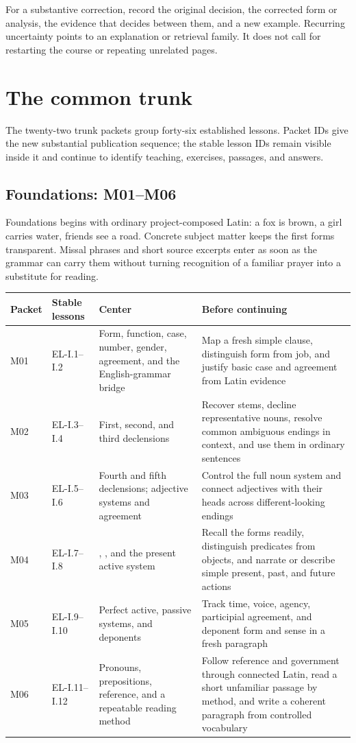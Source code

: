For a substantive correction, record the original decision, the corrected
form or analysis, the evidence that decides between them, and a new example.
Recurring uncertainty points to an explanation or retrieval family. It does
not call for restarting the course or repeating unrelated pages.

\chapter{The common trunk}

The twenty-two trunk packets group forty-six established lessons. Packet IDs
give the new substantial publication sequence; the stable lesson IDs remain
visible inside it and continue to identify teaching, exercises, passages, and
answers.

\section{Foundations: M01--M06}

Foundations begins with ordinary project-composed Latin: a fox is brown, a
girl carries water, friends see a road. Concrete subject matter keeps the first
forms transparent. Missal phrases and short source excerpts enter as soon as
the grammar can carry them without turning recognition of a familiar prayer
into a substitute for reading.

\begin{xltabular}{\linewidth}{@{}P{0.55in}P{1.0in}P{2.0in}Y@{}}
  \toprule
  \textbf{Packet} & \textbf{Stable lessons} & \textbf{Center} & \textbf{Before continuing} \\
  \midrule\endhead
  M01 & EL-I.1--I.2 & Form, function, case, number, gender, agreement, and the
  English-grammar bridge & Map a fresh simple clause, distinguish form from
  job, and justify basic case and agreement from Latin evidence \\
  M02 & EL-I.3--I.4 & First, second, and third declensions & Recover stems,
  decline representative nouns, resolve common ambiguous endings in context,
  and use them in ordinary sentences \\
  M03 & EL-I.5--I.6 & Fourth and fifth declensions; adjective systems and
  agreement & Control the full noun system and connect adjectives with their
  heads across different-looking endings \\
  M04 & EL-I.7--I.8 & , , and the present active
  system & Recall the forms readily, distinguish predicates from objects, and
  narrate or describe simple present, past, and future actions \\
  M05 & EL-I.9--I.10 & Perfect active, passive systems, and deponents & Track
  time, voice, agency, participial agreement, and deponent form and sense in a
  fresh paragraph \\
  M06 & EL-I.11--I.12 & Pronouns, prepositions, reference, and a repeatable
  reading method & Follow reference and government through connected Latin,
  read a short unfamiliar passage by method, and write a coherent paragraph
  from controlled vocabulary \\
  \bottomrule
\end{xltabular}


